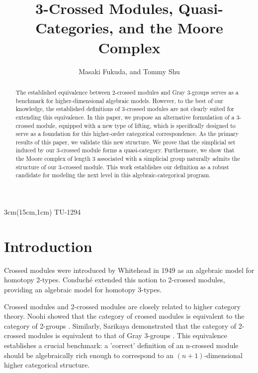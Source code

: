 \documentclass{tac}
\author{Masaki Fukuda, and Tommy Shu}
\title{3-Crossed Modules, Quasi-Categories, and the Moore Complex}
\begin{document}
\begin{textblock*}{3cm}(15cm,1cm)
\raggedleft
TU-1294
\end{textblock*}
 
  \maketitle



\begin{abstract}

The established equivalence between 2-crossed modules and Gray 3-groups \cite{SarikayaUlualan2024} serves as a benchmark for higher-dimensional algebraic models. 
However, to the best of our knowledge, the established definitions of 3-crossed modules \cite{Arvasi2009} are not clearly suited for extending this equivalence.
In this paper, we propose an alternative formulation of a 3-crossed module, equipped with a new type of lifting, which is specifically designed to serve as a foundation for this higher-order categorical correspondence.
As the primary results of this paper, we validate this new structure. We prove that the simplicial set induced by our 3-crossed module forms a quasi-category. Furthermore, we show that the Moore complex of length 3 associated with a simplicial group naturally admits the structure of our 3-crossed module. This work establishes our definition as a robust candidate for modeling the next level in this algebraic-categorical program.
\end{abstract}



\tableofcontents
\clearpage


\section{Introduction}\label{sec-Introduction}

Crossed modules were introduced by Whitehead in 1949 as an algebraic model for homotopy 2-types. Conduché extended this notion to 2-crossed modules, providing an algebraic model for homotopy 3-types.

Crossed modules and 2-crossed modules are closely related to higher category theory. Noohi showed that the category of crossed modules is equivalent to the category of 2-groups \cite{Noohi2007}. Similarly, Sarikaya demonstrated that the category of 2-crossed modules is equivalent to that of Gray 3-groups \cite{SarikayaUlualan2024}. This equivalence establishes a crucial benchmark: a 'correct' definition of an n-crossed module should be algebraically rich enough to correspond to an $(n+1)$-dimensional higher categorical structure.
\end{document}
